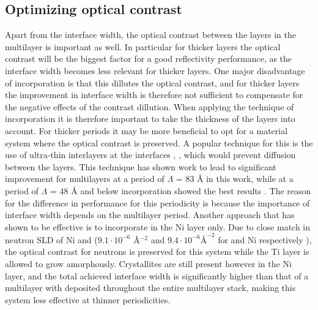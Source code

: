 \subsection{Optimizing optical contrast}
Apart from the interface width, the optical contrast between the layers in the multilayer is important as well. In particular for thicker layers the optical contrast will be the biggest factor for a good reflectivity performance, as the interface width becomes less relevant for thicker layers. One major disadvantage of \BC incorporation is that this dillutes the optical contrast, and for thicker layers the improvement in interface width is therefore not sufficient to compensate for the negative effects of the contrast dillution. When applying the technique of \BC incorporation it is therefore important to take the thickness of the layers into account. For thicker periods it may be more beneficial to opt for a material system where the optical contrast is preserved. A popular technique for this is the use of ultra-thin interlayers at the interfaces \cite{interlayers1} \cite{interlayers2}, \cite{interlayers3}, which would prevent diffusion between the layers. This technique has shown work to lead to significant improvement for multilayers at a period of $\Lambda$ = 83 Å in this work, while at a period of $\Lambda$ = 48 Å and below \BC incorporation showed the best results \cite{article4}. The reason for the difference in performance for this periodicity is because the importance of interface width depends on the multilayer period. Another approach that has shown to be effective is to incorporate \BC in the Ni layer only. Due to close match in neutron SLD of Ni and \BC ($9.1\cdot 10^{-6}$ Å$^{-2}$ and $9.4 \cdot 10^{-6} Å^{-2}$ for \BC and Ni respectively \cite{periodictable}), the optical contrast for neutrons is preserved for this system while the Ti layer is allowed to grow amorphously. Crystallites are still present however in the Ni layer, and the total achieved interface width is significantly higher than that of a multilayer with \BC deposited throughout the entire multilayer stack, making this system less effective at thinner periodicities.
\clearpage
